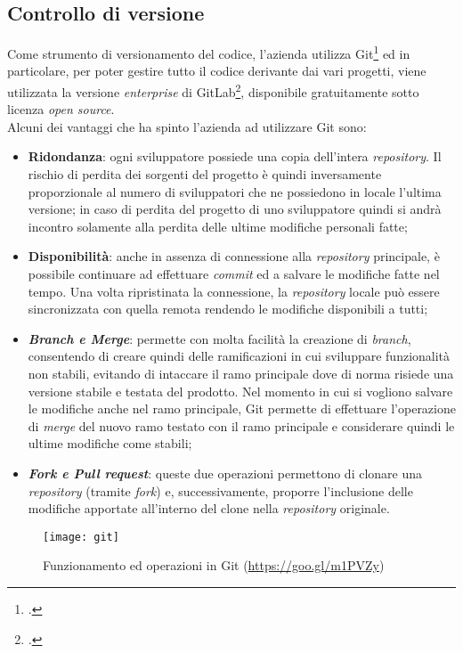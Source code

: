 \subsection{Controllo di versione}
Come strumento di versionamento del codice, l’azienda utilizza \gls{Git}\footcite{https://git-scm.com/} ed in particolare, per poter gestire tutto il codice derivante dai vari progetti, viene utilizzata la versione \textit{enterprise} di \gls{GitLab}\footcite{https://about.gitlab.com/}, disponibile gratuitamente sotto licenza \textit{open source}.\\
Alcuni dei vantaggi che ha spinto l’azienda ad utilizzare Git sono:
\begin{itemize}
	\item \textbf{Ridondanza}: ogni sviluppatore possiede una copia dell’intera \textit{repository}. Il rischio di perdita dei sorgenti del progetto è quindi inversamente proporzionale al numero di sviluppatori che ne possiedono in locale l’ultima versione; in caso di perdita del progetto di uno sviluppatore quindi si andrà incontro solamente alla perdita delle ultime modifiche personali fatte;
	\item \textbf{Disponibilità}: anche in assenza di connessione alla \textit{repository} principale, è possibile continuare ad effettuare \textit{commit} ed a salvare le modifiche fatte nel tempo. Una volta ripristinata la connessione, la \textit{repository} locale può essere sincronizzata con quella remota rendendo le modifiche disponibili a tutti;
	\item \textit{\textbf{Branch e Merge}}: permette con molta facilità la creazione di \textit{branch}, consentendo di creare quindi delle ramificazioni in cui sviluppare funzionalità non stabili, evitando di intaccare il ramo principale dove di norma risiede una versione stabile e testata del prodotto. Nel momento in cui si vogliono salvare le modifiche anche nel ramo principale, \gls{Git} permette di effettuare l’operazione di \textit{merge} del nuovo ramo testato con il ramo principale e considerare quindi le ultime modifiche come stabili;
	\item \textit{\textbf{Fork e Pull request}}: queste due operazioni permettono di clonare una \textit{repository} (tramite \textit{fork}) e, successivamente, proporre l’inclusione delle modifiche apportate all’interno del clone nella \textit{repository} originale.
\end{itemize}
\begin{figure}[!h] 
	\centering 
	\texttt{[image: git]} 
	\caption{Funzionamento ed operazioni in Git (\href{https://goo.gl/m1PVZy}{https://goo.gl/m1PVZy})}
\end{figure}


